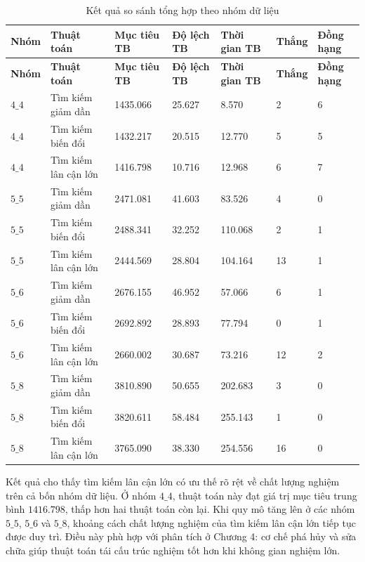 \begin{longtable}{|C{1.25cm}|p{3.2cm}|C{2.1cm}|C{2.0cm}|C{2.0cm}|C{1.5cm}|C{1.6cm}|}
\caption{Kết quả so sánh tổng hợp theo nhóm dữ liệu}\label{tab:chapter5-family-summary}\\
\hline
\textbf{Nhóm} & \textbf{Thuật toán} & \textbf{Mục tiêu TB} & \textbf{Độ lệch TB} & \textbf{Thời gian TB} & \textbf{Thắng} & \textbf{Đồng hạng} \\
\hline
\endfirsthead
\hline
\textbf{Nhóm} & \textbf{Thuật toán} & \textbf{Mục tiêu TB} & \textbf{Độ lệch TB} & \textbf{Thời gian TB} & \textbf{Thắng} & \textbf{Đồng hạng} \\
\hline
\endhead
$4\_4$ & Tìm kiếm giảm dần & 1435.066 & 25.627 & 8.570 & 2 & 6 \\
\hline
$4\_4$ & Tìm kiếm biến đổi & 1432.217 & 20.515 & 12.770 & 5 & 5 \\
\hline
$4\_4$ & Tìm kiếm lân cận lớn & 1416.798 & 10.716 & 12.968 & 6 & 7 \\
\hline
$5\_5$ & Tìm kiếm giảm dần & 2471.081 & 41.603 & 83.526 & 4 & 0 \\
\hline
$5\_5$ & Tìm kiếm biến đổi & 2488.341 & 32.252 & 110.068 & 2 & 1 \\
\hline
$5\_5$ & Tìm kiếm lân cận lớn & 2444.569 & 28.804 & 104.164 & 13 & 1 \\
\hline
$5\_6$ & Tìm kiếm giảm dần & 2676.155 & 46.952 & 57.066 & 6 & 1 \\
\hline
$5\_6$ & Tìm kiếm biến đổi & 2692.892 & 28.893 & 77.794 & 0 & 1 \\
\hline
$5\_6$ & Tìm kiếm lân cận lớn & 2660.002 & 30.687 & 73.216 & 12 & 2 \\
\hline
$5\_8$ & Tìm kiếm giảm dần & 3810.890 & 50.655 & 202.683 & 3 & 0 \\
\hline
$5\_8$ & Tìm kiếm biến đổi & 3820.611 & 58.484 & 255.143 & 1 & 0 \\
\hline
$5\_8$ & Tìm kiếm lân cận lớn & 3765.090 & 38.330 & 254.556 & 16 & 0 \\
\hline
\end{longtable}

Kết quả cho thấy tìm kiếm lân cận lớn có ưu thế rõ rệt về chất lượng nghiệm trên cả bốn nhóm dữ liệu. Ở nhóm $4\_4$, thuật toán này đạt giá trị mục tiêu trung bình $1416.798$, thấp hơn hai thuật toán còn lại. Khi quy mô tăng lên ở các nhóm $5\_5$, $5\_6$ và $5\_8$, khoảng cách chất lượng nghiệm của tìm kiếm lân cận lớn tiếp tục được duy trì. Điều này phù hợp với phân tích ở Chương 4: cơ chế phá hủy và sửa chữa giúp thuật toán tái cấu trúc nghiệm tốt hơn khi không gian nghiệm lớn.

